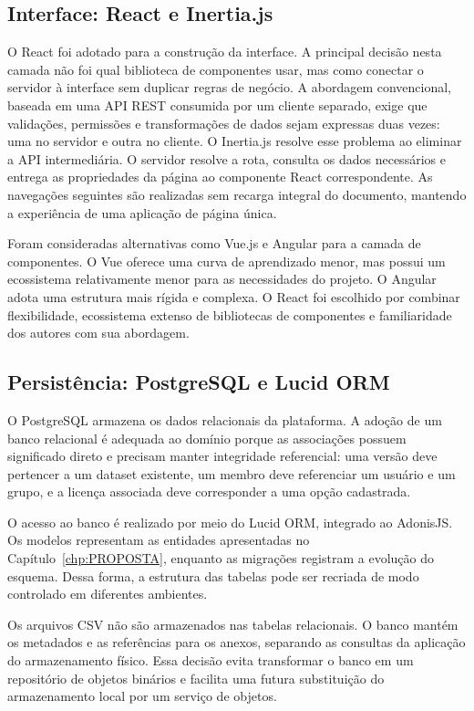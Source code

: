 \subsection{Interface: React e Inertia.js}

O React foi adotado para a construção da interface. A principal decisão nesta camada não foi qual biblioteca de componentes usar, mas como conectar o servidor à interface sem duplicar regras de negócio. A abordagem convencional, baseada em uma API REST consumida por um cliente separado, exige que validações, permissões e transformações de dados sejam expressas duas vezes: uma no servidor e outra no cliente. O Inertia.js resolve esse problema ao eliminar a API intermediária. O servidor resolve a rota, consulta os dados necessários e entrega as propriedades da página ao componente React correspondente. As navegações seguintes são realizadas sem recarga integral do documento, mantendo a experiência de uma aplicação de página única.

Foram consideradas alternativas como Vue.js e Angular para a camada de componentes. O Vue oferece uma curva de aprendizado menor, mas possui um ecossistema relativamente menor para as necessidades do projeto. O Angular adota uma estrutura mais rígida e complexa. O React foi escolhido por combinar flexibilidade, ecossistema extenso de bibliotecas de componentes e familiaridade dos autores com sua abordagem.

\subsection{Persistência: PostgreSQL e Lucid ORM}

O PostgreSQL armazena os dados relacionais da plataforma. A adoção de um banco relacional é adequada ao domínio porque as associações possuem significado direto e precisam manter integridade referencial: uma versão deve pertencer a um dataset existente, um membro deve referenciar um usuário e um grupo, e a licença associada deve corresponder a uma opção cadastrada.

O acesso ao banco é realizado por meio do Lucid ORM, integrado ao AdonisJS. Os modelos representam as entidades apresentadas no Capítulo~\ref{chp:PROPOSTA}, enquanto as migrações registram a evolução do esquema. Dessa forma, a estrutura das tabelas pode ser recriada de modo controlado em diferentes ambientes.

Os arquivos CSV não são armazenados nas tabelas relacionais. O banco mantém os metadados e as referências para os anexos, separando as consultas da aplicação do armazenamento físico. Essa decisão evita transformar o banco em um repositório de objetos binários e facilita uma futura substituição do armazenamento local por um serviço de objetos.

